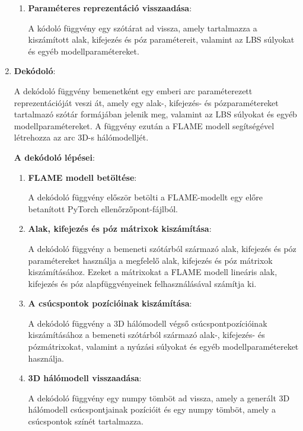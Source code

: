 \documentclass[12pt,a4]{article}
\begin{document}
\begin{enumerate}
\begin{enumerate}
            \item \textbf{Paraméteres reprezentáció visszaadása}:

            A kódoló függvény egy szótárat ad vissza, amely tartalmazza a kiszámított alak, kifejezés és póz paramétereit, valamint az LBS súlyokat és egyéb modellparamétereket.

        \end{enumerate}
        

        
        \item \textbf{Dekódoló}:

        A dekódoló függvény bemenetként egy emberi arc paraméterezett reprezentációját veszi át, amely egy alak-, kifejezés- és pózparamétereket tartalmazó szótár formájában jelenik meg, 
valamint az LBS súlyokat és egyéb modellparamétereket. A függvény ezután a FLAME modell segítségével létrehozza az arc 3D-s hálómodelljét.

        \textbf{A dekódoló lépései}:
        
        \begin{enumerate}
            \item \textbf{FLAME modell betöltése}:
            
            A dekódoló függvény először betölti a FLAME-modellt egy előre betanított PyTorch ellenőrzőpont-fájlból.

            \item \textbf{Alak, kifejezés és póz mátrixok kiszámítása}:
            
            A dekódoló függvény a bemeneti szótárból származó alak, kifejezés és póz paramétereket használja a megfelelő alak, kifejezés és póz mátrixok kiszámításához. 
Ezeket a mátrixokat a FLAME modell lineáris alak, kifejezés és póz alapfüggvényeinek felhasználásával számítja ki.

            \item \textbf{A csúcspontok pozícióinak kiszámítása}:
            
A dekódoló függvény a 3D hálómodell végső csúcspontpozícióinak kiszámításához a bemeneti szótárból származó alak-, kifejezés- és pózmátrixokat, valamint a nyúzási súlyokat és egyéb modellparamétereket használja.

            \item \textbf{3D hálómodell visszaadása}:
            
            A dekódoló függvény egy numpy tömböt ad vissza, amely a generált 3D hálómodell csúcspontjainak pozícióit és egy numpy tömböt, amely a csúcspontok színét tartalmazza.


\end{enumerate}
\end{enumerate}
\end{document}
